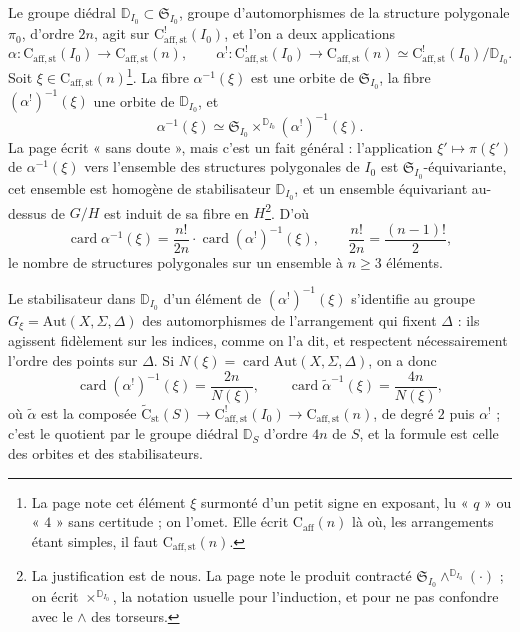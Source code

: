 \documentclass[11pt,a4paper]{article}
\begin{document}
Le groupe diédral $\mathbb{D}_{I_0} \subset \mathfrak{S}_{I_0}$, groupe
d'automorphismes de la structure polygonale $\pi_0$, d'ordre $2n$, agit sur
$\mathrm{C}^{!}_{\mathrm{aff,st}}(I_0)$, et l'on a deux applications
\[
\alpha : \mathrm{C}_{\mathrm{aff,st}}(I_0) \longrightarrow
\mathrm{C}_{\mathrm{aff,st}}(n), \qquad
\alpha^{!} : \mathrm{C}^{!}_{\mathrm{aff,st}}(I_0) \longrightarrow
\mathrm{C}_{\mathrm{aff,st}}(n) \simeq
\mathrm{C}^{!}_{\mathrm{aff,st}}(I_0)/\mathbb{D}_{I_0}.
\]
Soit $\xi \in \mathrm{C}_{\mathrm{aff,st}}(n)$\footnote{La page note cet
élément $\xi$ surmonté d'un petit signe en exposant, lu « $q$ » ou « $4$ »
sans certitude ; on l'omet. Elle écrit $\mathrm{C}_{\mathrm{aff}}(n)$ là où,
les arrangements étant simples, il faut $\mathrm{C}_{\mathrm{aff,st}}(n)$.}.
La fibre $\alpha^{-1}(\xi)$ est une orbite de $\mathfrak{S}_{I_0}$, la fibre
$(\alpha^{!})^{-1}(\xi)$ une orbite de $\mathbb{D}_{I_0}$, et
\[
\alpha^{-1}(\xi) \simeq \mathfrak{S}_{I_0} \times^{\mathbb{D}_{I_0}}
(\alpha^{!})^{-1}(\xi).
\]
La page écrit « sans doute », mais c'est un fait
général : l'application $\xi' \mapsto \pi(\xi')$ de $\alpha^{-1}(\xi)$ vers
l'ensemble des structures polygonales de $I_0$ est
$\mathfrak{S}_{I_0}$-équivariante, cet ensemble est homogène de stabilisateur
$\mathbb{D}_{I_0}$, et un ensemble équivariant au-dessus de $G/H$ est induit
de sa fibre en $H$\footnote{La justification est de nous. La page note le
produit contracté $\mathfrak{S}_{I_0} \wedge^{\mathbb{D}_{I_0}} (\cdot)$ ; on
écrit $\times^{\mathbb{D}_{I_0}}$, la notation usuelle pour l'induction, et
pour ne pas confondre avec le $\wedge$ des torseurs.}. D'où
\[
\operatorname{card} \alpha^{-1}(\xi) = \frac{n!}{2n} \cdot
\operatorname{card} (\alpha^{!})^{-1}(\xi), \qquad \frac{n!}{2n} =
\frac{(n-1)!}{2},
\]
le nombre de structures polygonales sur un ensemble à $n \geqslant 3$
éléments.

Le stabilisateur dans $\mathbb{D}_{I_0}$ d'un élément de
$(\alpha^{!})^{-1}(\xi)$ s'identifie au groupe $G_\xi = \mathrm{Aut}(X,
\Sigma, \Delta)$ des automorphismes de l'arrangement qui fixent $\Delta$ :
ils agissent fidèlement sur les indices, comme on l'a dit, et respectent
nécessairement l'ordre des points sur $\Delta$. Si $N(\xi) = \operatorname{card}
\mathrm{Aut}(X, \Sigma, \Delta)$, on a donc
\[
\operatorname{card} (\alpha^{!})^{-1}(\xi) = \frac{2n}{N(\xi)}, \qquad
\operatorname{card} \widetilde{\alpha}^{-1}(\xi) = \frac{4n}{N(\xi)},
\]
où $\widetilde{\alpha}$ est la composée $\widetilde{\mathrm{C}}_{\mathrm{st}}(S)
\to \mathrm{C}^{!}_{\mathrm{aff,st}}(I_0) \to \mathrm{C}_{\mathrm{aff,st}}(n)$,
de degré $2$ puis $\alpha^{!}$ ; c'est le quotient par le groupe diédral
$\mathbb{D}_S$ d'ordre $4n$ de $S$, et la formule est celle des orbites et
des stabilisateurs.
\end{document}
